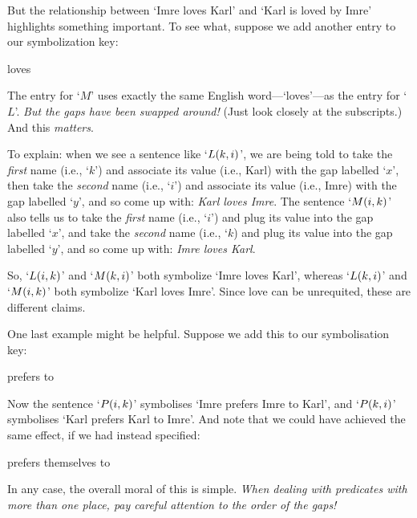 But the relationship between `Imre loves Karl' and `Karl is loved by Imre' highlights something important. To see what, suppose we add another entry to our symbolization key:
\begin{ekey}
	\item[\atom{M}{x,y}]  loves 
\end{ekey}
The entry for `$M$' uses exactly the same English word---`loves'---as the entry for `$L$'. \emph{But the gaps have been swapped around!} (Just look closely at the subscripts.) And this \emph{matters}.

To explain: when we see a sentence like `$\mathord{L}(k,i)$', we are being told to take the \emph{first} name (i.e., `$k$') and associate its value (i.e., Karl) with the gap labelled `$x$', then take the \emph{second} name (i.e., `$i$') and associate its value (i.e., Imre) with the gap labelled `$y$', and so come up with: \emph{Karl loves Imre}. The sentence `$\mathord{M}(i,k)$' also tells us to take the \emph{first} name (i.e., `$i$') and plug its value into the gap labelled `$x$', and take the \emph{second} name (i.e., `$k$) and plug its value into the gap labelled `$y$', and so come up with: \emph{Imre loves Karl}. 

So, `$\mathord{L}(i,k)$' and `$\mathord{M}(k,i)$' both symbolize `Imre loves Karl', whereas `$\mathord{L}(k,i)$' and `$\mathord{M}(i,k)$' both symbolize `Karl loves Imre'. Since love can be unrequited, these are different claims. 

One last example might be helpful. Suppose we add this to our symbolisation key: 
\begin{ekey}
	\item[\atom{P}{x,y}]  prefers  to 
\end{ekey}
Now the sentence `$\mathord{P}(i,k)$' symbolises `Imre prefers Imre to Karl', and `$\mathord{P}(k,i)$' symbolises `Karl prefers Karl to Imre'.  And note that we could have achieved the same effect, if we had instead specified:
\begin{ekey}
	\item[\atom{P}{x,y}]  prefers themselves to 
\end{ekey}
In any case, the overall moral of this is simple. \emph{When dealing with predicates with more than one place, pay careful attention to the order of the gaps!} 


